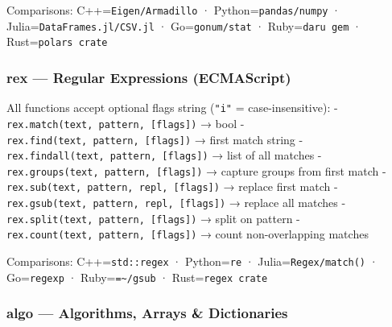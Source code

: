 \documentclass[
]{article}
\begin{document}
Comparisons: C++=\texttt{Eigen/Armadillo} · Python=\texttt{pandas/numpy}
· Julia=\texttt{DataFrames.jl/CSV.jl} · Go=\texttt{gonum/stat} ·
Ruby=\texttt{daru\ gem} · Rust=\texttt{polars\ crate}

\subsubsection{rex --- Regular Expressions
(ECMAScript)}\label{rex-regular-expressions-ecmascript}

All functions accept optional flags string (\texttt{"i"} =
case-insensitive): - \texttt{rex.match(text,\ pattern,\ {[}flags{]})} →
bool - \texttt{rex.find(text,\ pattern,\ {[}flags{]})} → first match
string - \texttt{rex.findall(text,\ pattern,\ {[}flags{]})} → list of
all matches - \texttt{rex.groups(text,\ pattern,\ {[}flags{]})} →
capture groups from first match -
\texttt{rex.sub(text,\ pattern,\ repl,\ {[}flags{]})} → replace first
match - \texttt{rex.gsub(text,\ pattern,\ repl,\ {[}flags{]})} → replace
all matches - \texttt{rex.split(text,\ pattern,\ {[}flags{]})} → split
on pattern - \texttt{rex.count(text,\ pattern,\ {[}flags{]})} → count
non-overlapping matches

Comparisons: C++=\texttt{std::regex} · Python=\texttt{re} ·
Julia=\texttt{Regex/match()} · Go=\texttt{regexp} ·
Ruby=\texttt{=\textasciitilde{}/gsub} · Rust=\texttt{regex\ crate}

\subsubsection{algo --- Algorithms, Arrays \&
Dictionaries}\label{algo-algorithms-arrays-dictionaries}
\end{document}
